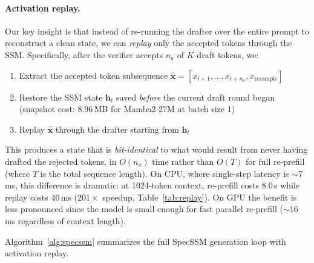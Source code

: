 \paragraph{Activation replay.}
Our key insight is that instead of re-running the drafter over the entire prompt to reconstruct a clean state, we can \emph{replay} only the accepted tokens through the SSM.
Specifically, after the verifier accepts $n_a$ of $K$ draft tokens, we:
\begin{enumerate}
  \item Extract the accepted token subsequence $\hat{\mathbf{x}} = [x_{t+1}, \ldots, x_{t+n_a}, x_{\mathrm{resample}}]$
  \item Restore the SSM state $\mathbf{h}_t$ saved \emph{before} the current draft round began (snapshot cost: 8.96\,MB for Mamba2-27M at batch size 1)
  \item Replay $\hat{\mathbf{x}}$ through the drafter starting from $\mathbf{h}_t$
\end{enumerate}
This produces a state that is \emph{bit-identical} to what would result from never having drafted the rejected tokens, in $O(n_a)$ time rather than $O(T)$ for full re-prefill (where $T$ is the total sequence length).
On CPU, where single-step latency is $\sim$7\,ms, this difference is dramatic: at 1024-token context, re-prefill costs 8.0\,s while replay costs 40\,ms ($201\times$ speedup, Table~\ref{tab:replay}).
On GPU the benefit is less pronounced since the model is small enough for fast parallel re-prefill ($\sim$16\,ms regardless of context length).

Algorithm~\ref{alg:specssm} summarizes the full SpecSSM generation loop with activation replay.

